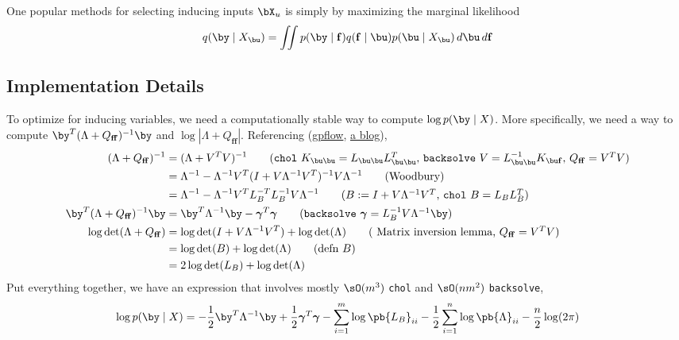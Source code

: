 \documentclass[11pt]{article}
\renewcommand\bf{\ensuremath{\mathbf{f}}}
\begin{document}
One popular methods for selecting inducing inputs $\bX_u$ is simply by maximizing the marginal likelihood
\begin{align}
    q(\by\mid X_{\bu})
        = \iint p(\by\mid \bf) q(\bf\mid \bu) p(\bu\mid X_{\bu}) \, d\bu \, d\bf
\end{align}


\subsection{Implementation Details}

To optimize for inducing variables, we need a computationally stable way to compute $\log p(\by\mid X)$. More specifically, we need a way to compute $\by^T (\Lambda + Q_{\bf\bf})^{-1} \by$ and $\log | \Lambda + Q_{\bf\bf} |$. Referencing (\href{https://github.com/GPflow/GPflow/blob/develop/gpflow/models/sgpr.py#L263}{gpflow}, \href{https://bwengals.github.io/pymc3-fitcvfe-implementation-notes.html}{a blog}),
\begin{align*}
    (\Lambda + Q_{\bf\bf})^{-1}
        &= (\Lambda + V^TV)^{-1}
            \tag{\texttt{chol} $K_{\bu\bu} = L_{\bu\bu} L_{\bu\bu}^T$, \texttt{backsolve} $V = L_{\bu\bu}^{-1}K_{\bu\bf}$, $Q_{\bf\bf} = V^TV$} \\ 
        &= \Lambda^{-1} - \Lambda^{-1} V^T (I + V\Lambda^{-1}V^T)^{-1} V \Lambda^{-1}
            \tag{Woodbury} \\
        &= \Lambda^{-1} - \Lambda^{-1} V^T L_B^{-T} L_B^{-1} V \Lambda^{-1}
            \tag{$B:= I + V\Lambda^{-1}V^T$, \texttt{chol} $B = L_{B}L_{B}^T$} \\
    \by^T (\Lambda + Q_{\bf\bf})^{-1} \by
        &= \by^T \Lambda^{-1} \by - \bgamma^T\bgamma
            \tag{\texttt{backsolve} $\bgamma = L_B^{-1} V\Lambda^{-1} \by $}  \\
    \log \det (\Lambda + Q_{\bf\bf})
        &= \log \det(I + V\Lambda^{-1}V^T) + \log \det(\Lambda)
            \tag{ Matrix inversion lemma, $Q_{\bf\bf} = V^TV$} \\ 
        &= \log \det(B) + \log \det(\Lambda)  
            \tag{defn $B$} \\
        &= 2\log \det(L_B) + \log \det(\Lambda)
\end{align*}
Put everything together, we have an expression that involves mostly $\sO(m^3)$ \texttt{chol} and $\sO(nm^2)$ \texttt{backsolve},
\begin{align}
    \log p(\by\mid X)
        = - \frac{1}{2} \by^T \Lambda^{-1} \by + \frac{1}{2} \bgamma^T\bgamma - \sum_{i=1}^m \log \pb{L_B}_{ii} -\frac{1}{2} \sum_{i=1}^n \log \pb{\Lambda}_{ii} - \frac{n}{2} \log(2\pi)
\end{align}
\end{document}
